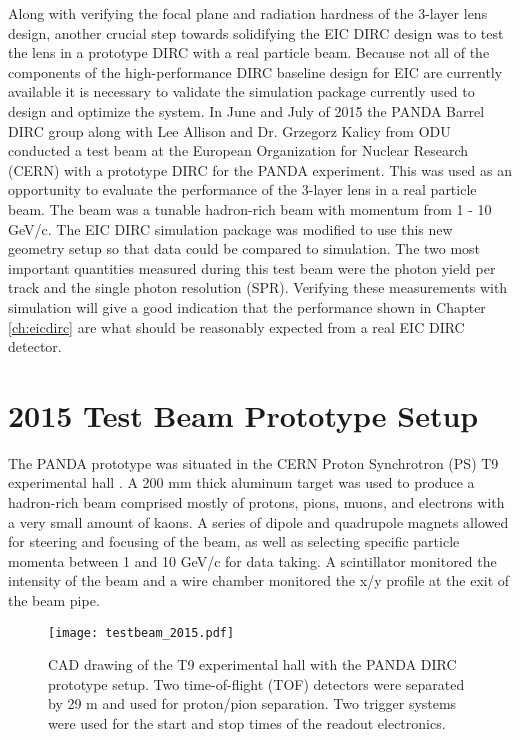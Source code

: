 \label{ch:analysis}

Along with verifying the focal plane and radiation hardness of the 3-layer lens design, another crucial step towards solidifying the EIC DIRC design was to test the lens in a prototype DIRC with a real particle beam. Because not all of the components of the high-performance DIRC baseline design for EIC are currently available it is necessary to validate the simulation package currently used to design and optimize the system. In June and July of 2015 the PANDA Barrel DIRC group along with Lee Allison and Dr. Grzegorz Kalicy from ODU conducted a test beam at the European Organization for Nuclear Research (CERN) with a prototype DIRC for the PANDA experiment. This was used as an opportunity to evaluate the performance of the 3-layer lens in a real particle beam. The beam was a tunable hadron-rich beam with momentum from 1 - 10 GeV/c. The EIC DIRC simulation package was modified to use this new geometry setup so that data could be compared to simulation. The two most important quantities measured during this test beam were the photon yield per track and the single photon resolution (SPR). Verifying these measurements with simulation will give a good indication that the performance shown in Chapter \ref{ch:eicdirc} are what should be reasonably expected from a real EIC DIRC detector.

\section{2015 Test Beam Prototype Setup}
The PANDA prototype was situated in the CERN Proton Synchrotron (PS) T9 experimental hall \cite{CERN_T9}. A 200 mm thick aluminum target was used to produce a hadron-rich beam comprised mostly of protons, pions, muons, and electrons with a very small amount of kaons. A series of dipole and quadrupole magnets allowed for steering and focusing of the beam, as well as selecting specific particle momenta between 1 and 10 GeV/c for data taking. A scintillator monitored the intensity of the beam and a wire chamber monitored the x/y profile at the exit of the beam pipe.

\begin{figure}[!htb]
	\centering
	\texttt{[image: testbeam\_2015.pdf]}
	\caption{CAD drawing of the T9 experimental hall with the PANDA DIRC prototype setup. Two time-of-flight (TOF) detectors were separated by 29 m and used for proton/pion separation. Two trigger systems were used for the start and stop times of the readout electronics.}
	\label{fig:testbeam_2015}
\end{figure}

